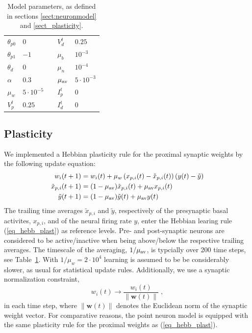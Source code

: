 \documentclass[utf8]{frontiersSCNS} %
\begin{document}
\begin{table}[b]
\caption{Model parameters,
as defined in sections \ref{sect:neuronmodel} and
\ref{sect_plasticity}.}
\begin{tabular}{ l | l || l | l }
		$\theta_{p0}$ & $0$ & $V_d^t$ & $0.25$ \\
		$\theta_{p1}$ & $-1$ & $\mu_b$ & $10^{-3}$ \\ 
		$\theta_{d}$ & $0$ & $\mu_n$ & $10^{-4}$ \\  
		$\alpha$ & $0.3$ & $\mu_{\rm av}$ & $5 \cdot 10^{-3}$ \\   
		$\mu_w$ & $5 \cdot 10^{-5}\quad$ & $I_p^t$ & $0$ \\
		$V_p^t$ & $0.25$ & $I_d^t$ & $0$  
\end{tabular}
\label{tab_parameters}
\end{table}

\subsection{Plasticity\label{sect_plasticity}}

We implemented a Hebbian plasticity rule for 
the proximal synaptic weights by the following 
update equation:
\begin{align}
w_i(t+1) &= w_i(t) + \mu_w \left(x_{p,i}(t) - \tilde{x}_{p,i}(t)\right)
\left(y(t) - \tilde{y} \right)
\label{eq_hebb_plast} \\
\tilde{x}_{p,i}(t+1) &= 
(1-\mu_{\rm av})\tilde{x}_{p,i}(t) + \mu_{\rm av}x_{p,i}(t) 
\label{eq_tilde_x_p_i}\\
\tilde{y}(t+1) &= (1-\mu_{\rm av})\tilde{y}(t) + \mu_{\rm av}y(t)
\label{eq_tilde_y}
\end{align}
The trailing time averages $\tilde{x}_{p,i}$ and
$\tilde{y}$, respectively of the presynaptic 
basal activites, $x_{p,i}$, and of the neural
firing rate $y$, enter the Hebbian learing
rule (\ref{eq_hebb_plast}) as reference levels.
Pre- and post-synaptic neurons are considered
to be active/inactive when being above/below
the respective trailing averages. The
timescale of the averaging, $1/\mu_{\rm av}$,
is typcially over 200 time steps, see
Table~\ref{tab_parameters}. 
With $1/\mu_w=2\cdot10^4$ learning is 
assumed to be be considerably slower, 
as usual for statistical update rules.
Additionally, 
we use a synaptic normalization constraint,
\begin{equation}
w_i(t) \rightarrow \frac{w_i(t)}{\lVert 
\mathbf{w}(t)\rVert}\;,
\label{eq:weight_norm}
\end{equation}
in each time step, where 
$\lVert \mathbf{w}(t)\rVert$ denotes the Euclidean
norm of the synaptic weight vector. For comparative 
reasons, the point neuron model is equipped with the
same plasticity rule for the proximal weights as 
(\ref{eq_hebb_plast}). 
\end{document}
